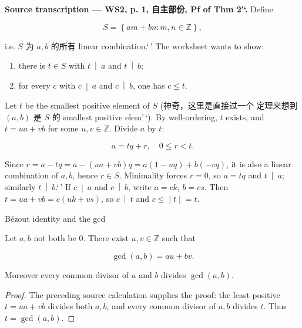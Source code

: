\textbf{Source transcription --- WS2, p. 1, 自主部份, Pf of Thm 2′`.} Define

\[S = \left\{ {am + bn:m,n \in \mathbb{Z}} \right\},\]

i.e. \(S\) 为 \(a,b\) 的所有 linear combination.`\,' The worksheet wants to show:

\begin{enumerate}
\tightlist
\item
  there is \(t \in S\) with \(\left. t\  \middle| \ a \right.\) and \(\left. t\  \middle| \ b \right.\);
\item
  for every \(c\) with \(\left. c\  \middle| \ a \right.\) and \(\left. c\  \middle| \ b \right.\), one has \(c \leq t\).
\end{enumerate}

Let \(t\) be the smallest positive element of \(S\) (神奇，这里是直接过一个 定理来想到 \(\left( {a,b} \right)\) 是 \(S\) 的 smallest positive elem'\,`). By well-ordering, \(t\) exists, and \(t = ua + vb\) for some \(u,v \in \mathbb{Z}\). Divide \(a\) by \(t\):

\[a = tq + r,\quad 0 \leq r < t.\]

Since \(r = a - tq = a - \left( {ua + vb} \right)q = a\left( {1 - uq} \right) + b\left( {- vq} \right)\), it is also a linear combination of \(a,b\), hence \(r \in S\). Minimality forces \(r = 0\), so \(a = tq\) and \(\left. t\  \middle| \ a \right.\); similarly \(\left. t\  \middle| \ b \right.\).`\,' If \(\left. c\  \middle| \ a \right.\) and \(\left. c\  \middle| \ b \right.\), write \(a = ck\), \(b = cs\). Then \(t = ua + vb = c\left( {uk + vs} \right)\), so \(\left. c\  \middle| \ t \right.\) and \(\left. c \leq \middle| t \middle| = t \right.\).

\begin{theorem}{Bézout identity and the gcd}

Let \(a,b\) not both be \(0\). There exist \(u,v \in \mathbb{Z}\) such that

\[\gcd\left( {a,b} \right) = au + bv.\]

Moreover every common divisor of \(a\) and \(b\) divides \(\gcd\left( {a,b} \right)\).

\end{theorem}

\begin{proof}

The preceding source calculation supplies the proof: the least positive \(t = ua + vb\) divides both \(a,b\), and every common divisor of \(a,b\) divides \(t\). Thus \(t = \gcd\left( {a,b} \right)\).

\end{proof}

